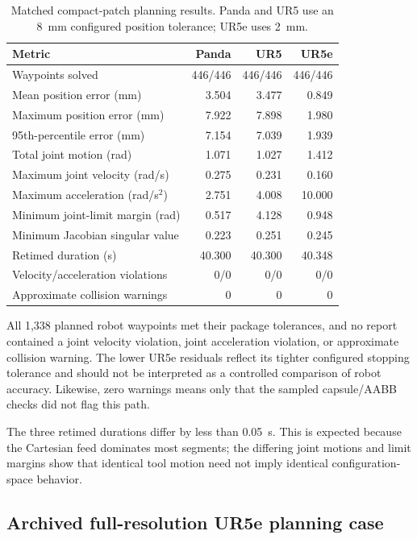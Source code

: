 \documentclass[letterpaper,10pt,conference]{ieeeconf}
\begin{document}
\begin{table}[!t]
\centering
\caption{Matched compact-patch planning results.  Panda and UR5 use an
\SI{8}{\milli\meter} configured position tolerance; UR5e uses
\SI{2}{\milli\meter}.}
\label{tab:compact-results}
\footnotesize
\begin{tabular}{@{}lrrr@{}}
\toprule
Metric & Panda & UR5 & UR5e \\
\midrule
Waypoints solved & 446/446 & 446/446 & 446/446 \\
Mean position error (mm) & 3.504 & 3.477 & 0.849 \\
Maximum position error (mm) & 7.922 & 7.898 & 1.980 \\
95th-percentile error (mm) & 7.154 & 7.039 & 1.939 \\
Total joint motion (rad) & 1.071 & 1.027 & 1.412 \\
Maximum joint velocity (rad/s) & 0.275 & 0.231 & 0.160 \\
Maximum acceleration (rad/s$^2$) & 2.751 & 4.008 & 10.000 \\
Minimum joint-limit margin (rad) & 0.517 & 4.128 & 0.948 \\
Minimum Jacobian singular value & 0.223 & 0.251 & 0.245 \\
Retimed duration (s) & 40.300 & 40.300 & 40.348 \\
Velocity/acceleration violations & 0/0 & 0/0 & 0/0 \\
Approximate collision warnings & 0 & 0 & 0 \\
\bottomrule
\end{tabular}
\end{table}

All 1,338 planned robot waypoints met their package tolerances, and no report
contained a joint velocity violation, joint acceleration violation, or
approximate collision warning.  The lower UR5e residuals reflect its tighter
configured stopping tolerance and should not be interpreted as a controlled
comparison of robot accuracy.  Likewise, zero warnings means only that the
sampled capsule/AABB checks did not flag this path.

The three retimed durations differ by less than \SI{0.05}{\second}.  This is
expected because the Cartesian feed dominates most segments; the differing
joint motions and limit margins show that identical tool motion need not imply
identical configuration-space behavior.

\subsection{Archived full-resolution UR5e planning case}
\end{document}
